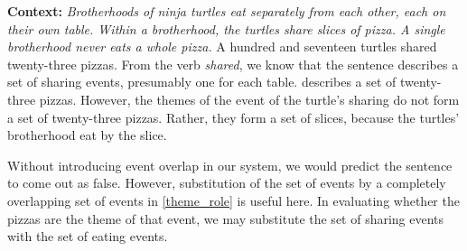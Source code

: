 \pex
\a 
\textbf{Context:}
\emph{
Brotherhoods of ninja turtles eat separately from each other, each on their own table. 
Within a brotherhood, the turtles share slices of pizza.
A single brotherhood never eats a whole pizza.
}
\a 
A hundred and seventeen turtles shared twenty-three pizzas.
\xe
%
From the verb \emph{shared}, we know that the sentence describes a set of sharing events, presumably one for each table.   describes a set of twenty-three pizzas. However, the themes of the event of the turtle's sharing do not form a set of twenty-three pizzas. Rather, they form a set of slices, because the turtles' brotherhood eat by the slice.

Without introducing event overlap in our system, we would predict the sentence to come out as false.
However, substitution of the set of events by a completely overlapping set of events in \cref{theme_role} is useful here. In evaluating whether the pizzas are the theme of that event, we may substitute the set of sharing events with the set of eating events.


